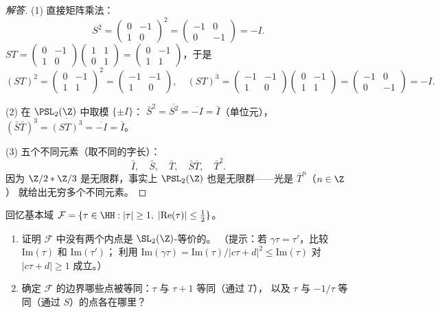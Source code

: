 \begin{proof}[解答]
(1) 直接矩阵乘法：
\[
  S^2 = \begin{pmatrix}0&-1\\1&0\end{pmatrix}^2
      = \begin{pmatrix}-1&0\\0&-1\end{pmatrix} = -I.
\]
$ST = \begin{pmatrix}0&-1\\1&0\end{pmatrix}\begin{pmatrix}1&1\\0&1\end{pmatrix}
= \begin{pmatrix}0&-1\\1&1\end{pmatrix}$，于是
\[
  (ST)^2 = \begin{pmatrix}0&-1\\1&1\end{pmatrix}^2
         = \begin{pmatrix}-1&-1\\1&0\end{pmatrix},
  \quad
  (ST)^3 = \begin{pmatrix}-1&-1\\1&0\end{pmatrix}\begin{pmatrix}0&-1\\1&1\end{pmatrix}
         = \begin{pmatrix}-1&0\\0&-1\end{pmatrix} = -I.
\]

(2) 在 $\PSL_2(\Z)$ 中取模 $\{\pm I\}$：
$\bar{S}^2 = \overline{S^2} = \overline{-I} = \bar{I}$（单位元），
$(\bar{S}\bar{T})^3 = \overline{(ST)^3} = \overline{-I} = \bar{I}$。

(3) 五个不同元素（取不同的字长）：
\[
  \bar{I},\quad \bar{S},\quad \bar{T},\quad \bar{S}\bar{T},\quad \bar{T}^2.
\]
因为 $\Z/2*\Z/3$ 是无限群，事实上 $\PSL_2(\Z)$ 也是无限群——光是 $\bar{T}^n$（$n \in \Z$）
就给出无穷多个不同元素。
\end{proof}

\begin{exercise}
\label{ex:ch1-fund-domain-action}
回忆基本域 $\mathcal{F} = \{\tau \in \HH : |\tau| \geq 1,\; |\mathrm{Re}(\tau)| \leq \tfrac{1}{2}\}$。
\begin{enumerate}
  \item[(1)] 证明 $\mathcal{F}$ 中没有两个内点是 $\SL_2(\Z)$-等价的。
    （提示：若 $\gamma\tau = \tau'$，比较 $\mathrm{Im}(\tau)$ 和 $\mathrm{Im}(\tau')$；
    利用 $\mathrm{Im}(\gamma\tau) = \mathrm{Im}(\tau)/|c\tau+d|^2 \leq \mathrm{Im}(\tau)$
    对 $|c\tau+d|\geq 1$ 成立。）
  \item[(2)] 确定 $\mathcal{F}$ 的边界哪些点被等同：$\tau$ 与 $\tau+1$ 等同（通过 $T$），
    以及 $\tau$ 与 $-1/\tau$ 等同（通过 $S$）的点各在哪里？
\end{enumerate}
\end{exercise}


